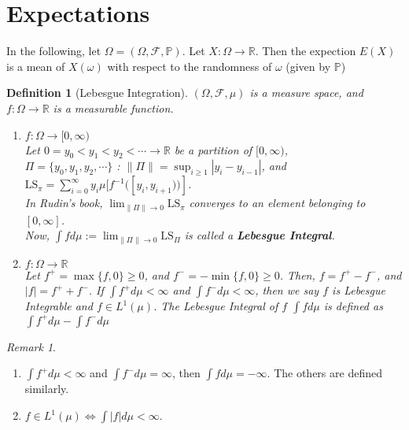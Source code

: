 \documentclass[12pt]{report}
\theoremstyle{break}
\theoremstyle{newdef}
\newtheorem{defn}[thm]{Definition} %
\theoremstyle{remark}
\newtheorem*{rem}{Remark} %
\begin{document}
\section{Expectations}
In the following, let $\Omega = (\Omega, \mathcal{F}, \mathbb{P})$.
Let $X : \Omega \rightarrow \mathbb{R}$.
Then the expection $E(X)$ is a mean of $X(\omega)$ with respect to the randomness of $\omega$ (given by $\mathbb{P}$)


\begin{defn}[Lebesgue Integration]
$(\Omega, \mathcal{F}, \mu)$ is a measure space, and $f : \Omega \rightarrow \mathbb{R}$ is a measurable function.
\begin{enumerate}[label = (\arabic*)]
\item $f : \Omega \rightarrow [0,\infty)$\\
Let $0 = y_0 < y_1 < y_2 < \cdots \rightarrow \mathbb{R}$ be a partition of $[0,\infty)$,\\
$\Pi = \{y_0, y_1, y_2, \cdots\}$ : $\|\Pi\| = \sup_{i\geq 1}|y_i-y_{i-1}|$, and\\
$\text{LS}_\pi = \sum_{i=0}^\infty y_i \mu[f^{-1}([y_i,y_{i+1}))]$.\\
In Rudin's book, $\lim_{\|\Pi\|\rightarrow 0} \text{LS}_\pi$ converges to an element belonging to $[0,\infty]$.\\
Now, $\int fd\mu := \lim_{\|\Pi\|\rightarrow 0}\text{LS}_{\Pi}$ is called a \textbf{Lebesgue Integral}.

\item $f : \Omega \rightarrow \mathbb{R}$\\
Let $f^+ = \max\{f,0\} \geq 0$, and $f^- = -\min\{f,0\} \geq 0$.
Then, $f = f^+ - f^-$, and $|f| = f^+ + f^-$.
If $\int f^+d\mu < \infty$ and $\int f^- d\mu < \infty$, then we say $f$ is Lebesgue Integrable and $f \in L^1(\mu)$.
The Lebesgue Integral of $f$ $\int fd\mu$ is defined as $\int f^+ d\mu - \int f^- d\mu$
\end{enumerate}
\end{defn}

\begin{rem}
\leavevmode
\begin{enumerate}
\item $\int f^+ d\mu < \infty$ and $\int f^- d\mu = \infty$, then $\int fd\mu = -\infty$.
The others are defined similarly.
\item $f \in L^1(\mu) \Leftrightarrow \int |f|d\mu < \infty$.
\end{enumerate}
\end{rem}
\end{document}
